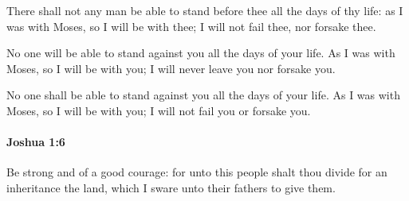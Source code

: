 			\begin{versebox}
					\item[BHS] 
					\item[ASV] There shall not any man be able to stand before thee all the days of thy life: as I was with Moses, so I will be with thee; I will not fail thee, nor forsake thee.
					\item[NIV] No one will be able to stand against you all the days of your life. As I was with Moses, so I will be with you; I will never leave you nor forsake you.
					\item[NRSV] No one shall be able to stand against you all the days of your life. As I was with Moses, so I will be with you; I will not fail you or forsake you.
			\end{versebox}

		\paragraph{Joshua 1:6} %
			\label{JOSHUA-1-6}

			Be strong and of a good courage: for unto this people shalt thou divide for an inheritance the land, which I sware unto their fathers to give them.

